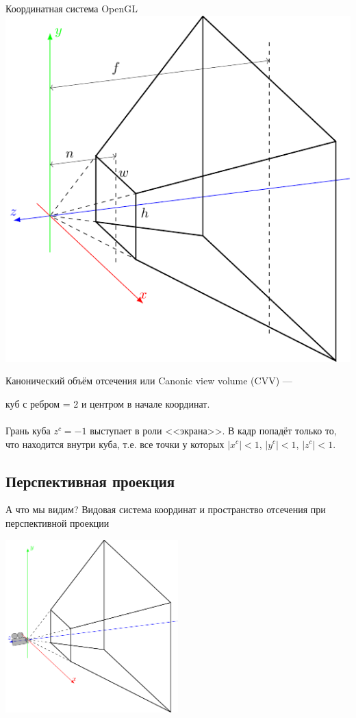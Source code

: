 \documentclass[10pt]{beamer}
\begin{document}
	\begin{frame}{Координатная система OpenGL}
		{
			\includegraphics[page=3]{cvv.pdf}
		}
		{
			Канонический объём отсечения или Canonic view volume (CVV) ---
			
			куб с ребром = 2 и центром в начале координат. \\~\\
			
			Грань куба $z^c=-1$ выступает в роли <<экрана>>. В кадр попадёт только то, что находится внутри куба, т.е. все точки у которых $|x^c|<1$,  $|y^c|<1$, $|z^c|< 1$.
		}
	\end{frame}
	
	
	\subsection{Перспективная проекция}
	
	\begin{frame}{А что мы видим?}
		\centering
		Видовая система координат и пространство отсечения при перспективной проекции
		
		\includegraphics[page=1, width=0.5\textwidth]{cvv_empty.pdf}
		
	\end{frame}
	
\end{document}
